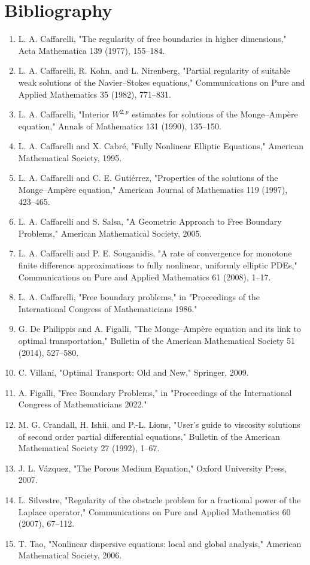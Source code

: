 \section*{Bibliography}
\begin{enumerate}
\item L. A. Caffarelli, "The regularity of free boundaries in higher dimensions," Acta Mathematica 139 (1977), 155--184.
\item L. A. Caffarelli, R. Kohn, and L. Nirenberg, "Partial regularity of suitable weak solutions of the Navier--Stokes equations," Communications on Pure and Applied Mathematics 35 (1982), 771--831.
\item L. A. Caffarelli, "Interior $W^{2,p}$ estimates for solutions of the Monge--Amp\`ere equation," Annals of Mathematics 131 (1990), 135--150.
\item L. A. Caffarelli and X. Cabr\'e, "Fully Nonlinear Elliptic Equations," American Mathematical Society, 1995.
\item L. A. Caffarelli and C. E. Guti\'errez, "Properties of the solutions of the Monge--Amp\`ere equation," American Journal of Mathematics 119 (1997), 423--465.
\item L. A. Caffarelli and S. Salsa, "A Geometric Approach to Free Boundary Problems," American Mathematical Society, 2005.
\item L. A. Caffarelli and P. E. Souganidis, "A rate of convergence for monotone finite difference approximations to fully nonlinear, uniformly elliptic PDEs," Communications on Pure and Applied Mathematics 61 (2008), 1--17.
\item L. A. Caffarelli, "Free boundary problems," in "Proceedings of the International Congress of Mathematicians 1986."
\item G. De Philippis and A. Figalli, "The Monge--Amp\`ere equation and its link to optimal transportation," Bulletin of the American Mathematical Society 51 (2014), 527--580.
\item C. Villani, "Optimal Transport: Old and New," Springer, 2009.
\item A. Figalli, "Free Boundary Problems," in "Proceedings of the International Congress of Mathematicians 2022."
\item M. G. Crandall, H. Ishii, and P.-L. Lions, "User's guide to viscosity solutions of second order partial differential equations," Bulletin of the American Mathematical Society 27 (1992), 1--67.
\item J. L. V\'azquez, "The Porous Medium Equation," Oxford University Press, 2007.
\item L. Silvestre, "Regularity of the obstacle problem for a fractional power of the Laplace operator," Communications on Pure and Applied Mathematics 60 (2007), 67--112.
\item T. Tao, "Nonlinear dispersive equations: local and global analysis," American Mathematical Society, 2006.
\end{enumerate}
